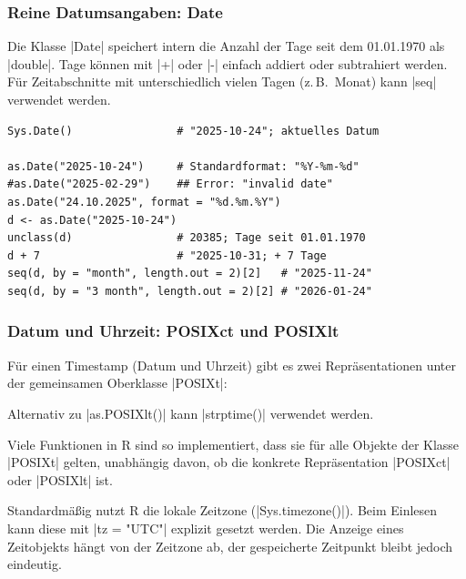 \documentclass[10pt,twocolumn]{scrartcl}
\renewcommand{\lstinline}{\mycoloredinline}
\begin{document}
\subsubsection{Reine Datumsangaben: Date}

Die Klasse \lstinline|Date| speichert intern die Anzahl der Tage seit dem 01.01.1970 als \lstinline|double|. Tage können mit \lstinline|+| oder \lstinline|-| einfach addiert oder subtrahiert werden. Für Zeitabschnitte mit unterschiedlich vielen Tagen (z.\,B.\ Monat) kann \lstinline|seq| verwendet werden.

\begin{lstlisting}
Sys.Date()                # "2025-10-24"; aktuelles Datum

as.Date("2025-10-24")     # Standardformat: "%Y-%m-%d"
#as.Date("2025-02-29")    ## Error: "invalid date"
as.Date("24.10.2025", format = "%d.%m.%Y")
d <- as.Date("2025-10-24")
unclass(d)                # 20385; Tage seit 01.01.1970
d + 7                     # "2025-10-31; + 7 Tage
seq(d, by = "month", length.out = 2)[2]   # "2025-11-24"
seq(d, by = "3 month", length.out = 2)[2] # "2026-01-24"
\end{lstlisting}


\subsubsection{Datum und Uhrzeit: POSIXct und POSIXlt}

Für einen Timestamp (Datum und Uhrzeit) gibt es zwei Repräsentationen unter der gemeinsamen Oberklasse \lstinline|POSIXt|:


Alternativ zu \lstinline|as.POSIXlt()| kann \lstinline|strptime()| verwendet werden.

Viele Funktionen in R sind so implementiert, dass sie für alle Objekte der Klasse \lstinline|POSIXt| gelten, unabhängig davon, ob die konkrete Repräsentation \lstinline|POSIXct| oder \lstinline|POSIXlt| ist.

Standardmäßig nutzt R die lokale Zeitzone (\lstinline|Sys.timezone()|). Beim Einlesen kann diese mit \lstinline|tz = "UTC"| explizit gesetzt werden. Die Anzeige eines Zeitobjekts hängt von der Zeitzone ab, der gespeicherte Zeitpunkt bleibt jedoch eindeutig.
\end{document}
